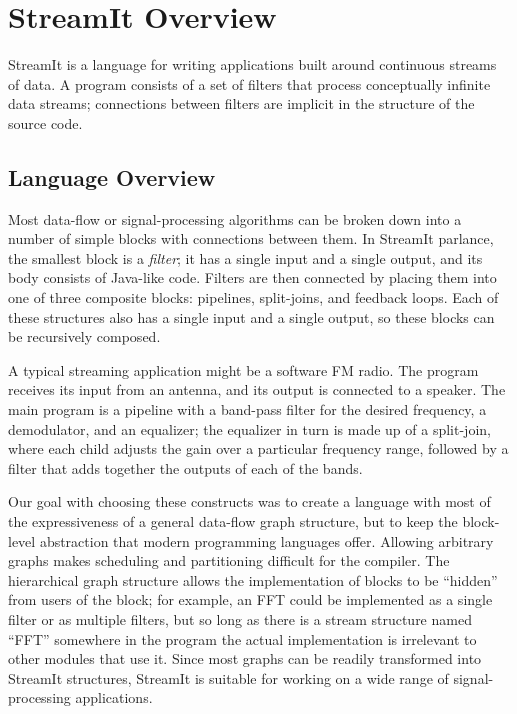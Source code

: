 \section{StreamIt Overview}

StreamIt is a language for writing applications built around
continuous streams of data.  A program consists of a set of filters
that process conceptually infinite data streams; connections between
filters are implicit in the structure of the source code.

\subsection{Language Overview}

Most data-flow or signal-processing algorithms can be broken down into
a number of simple blocks with connections between them.  In StreamIt
parlance, the smallest block is a \emph{filter}; it has a single input
and a single output, and its body consists of Java-like code.  Filters
are then connected by placing them into one of three composite blocks:
pipelines, split-joins, and feedback loops.  Each of these structures
also has a single input and a single output, so these blocks can be
recursively composed.

A typical streaming application might be a software FM radio.  The
program receives its input from an antenna, and its output is
connected to a speaker.  The main program is a pipeline with a
band-pass filter for the desired frequency, a demodulator, and an
equalizer; the equalizer in turn is made up of a split-join, where
each child adjusts the gain over a particular frequency range, followed
by a filter that adds together the outputs of each of the bands.

Our goal with choosing these constructs was to create a language with
most of the expressiveness of a general data-flow graph structure, but
to keep the block-level abstraction that modern programming languages
offer.  Allowing arbitrary graphs makes scheduling and partitioning
difficult for the compiler.  The hierarchical graph structure allows
the implementation of blocks to be ``hidden'' from users of the block;
for example, an FFT could be implemented as a single filter or as
multiple filters, but so long as there is a stream structure named
``FFT'' somewhere in the program the actual implementation is
irrelevant to other modules that use it.  Since most graphs can be
readily transformed into StreamIt structures, StreamIt is suitable for
working on a wide range of signal-processing applications.

